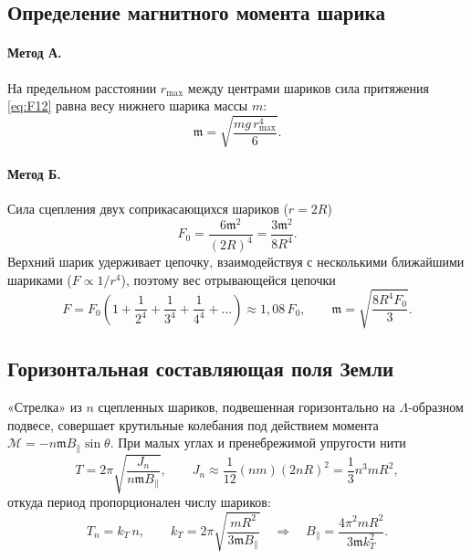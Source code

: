 \documentclass[a4paper,12pt]{article}
\newcommand{\mm}{\mathfrak{m}}
\begin{document}
\subsection{Определение магнитного момента шарика}
\paragraph{Метод А.} На предельном расстоянии $r_\text{max}$ между центрами
шариков сила притяжения \cref{eq:F12} равна весу нижнего шарика массы $m$:
\begin{equation}
    \label{eq:methodA}
    \mm = \sqrt{\frac{mg\,r_\text{max}^4}{6}}.
\end{equation}

\paragraph{Метод Б.} Сила сцепления двух соприкасающихся шариков ($r = 2R$)
\begin{equation}
    \label{eq:F0}
    F_0 = \frac{6\mm^2}{(2R)^4} = \frac{3\mm^2}{8R^4}.
\end{equation}
Верхний шарик удерживает цепочку, взаимодействуя с несколькими ближайшими
шариками ($F\propto 1/r^4$), поэтому вес отрывающейся цепочки
\begin{equation}
    \label{eq:chain}
    F = F_0\left(1 + \frac{1}{2^4} + \frac{1}{3^4} + \frac{1}{4^4} + \ldots\right)
      \approx 1{,}08\,F_0,
    \qquad
    \mm = \sqrt{\frac{8R^4 F_0}{3}}.
\end{equation}

\subsection{Горизонтальная составляющая поля Земли}
«Стрелка» из $n$ сцепленных шариков, подвешенная горизонтально на
$\Lambda$-образном подвесе, совершает крутильные колебания под действием
момента $\mathcal{M} = -n\mm B_\parallel\sin\theta$. При малых углах и
пренебрежимой упругости нити
\begin{equation}
    \label{eq:Tn_general}
    T = 2\pi\sqrt{\frac{J_n}{n\mm B_\parallel}},
    \qquad
    J_n \approx \frac{1}{12}(nm)(2nR)^2 = \frac{1}{3}n^3 mR^2,
\end{equation}
откуда период пропорционален числу шариков:
\begin{equation}
    \label{eq:Tn}
    T_n = k_T\,n, \qquad k_T = 2\pi\sqrt{\frac{mR^2}{3\mm B_\parallel}}
    \quad\Rightarrow\quad
    B_\parallel = \frac{4\pi^2 mR^2}{3\mm k_T^2}.
\end{equation}
\end{document}
